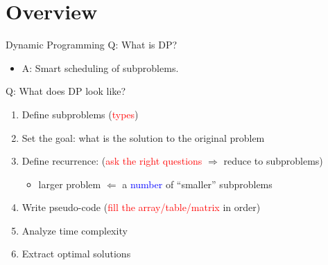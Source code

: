 \section{Overview}

\begin{frame}{Dynamic Programming}
  Q: What is DP?
  \begin{itemize}
    \item A: Smart scheduling of subproblems.
  \end{itemize}

  \vspace{0.20cm}
  Q: What does DP look like?
  \begin{enumerate}
    \item Define subproblems (\textcolor{red}{types})
    \item Set the goal: what is the solution to the original problem
    \item Define recurrence: (\textcolor{red}{ask the right questions} $\Rightarrow$ reduce to subproblems)
      \begin{itemize}
	\item larger problem $\Leftarrow$ a \textcolor{blue}{number} of ``smaller'' subproblems
      \end{itemize}
    \item Write pseudo-code (\textcolor{red}{fill the array/table/matrix} in order) 
    \item Analyze time complexity
    \item Extract optimal solutions
  \end{enumerate}
\end{frame}
